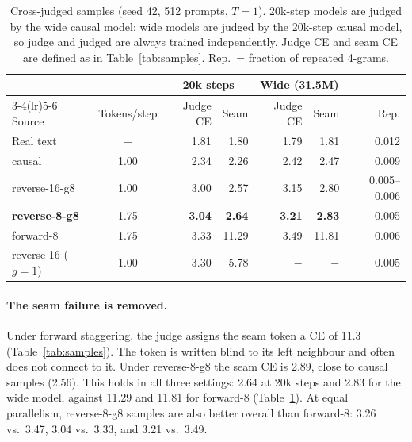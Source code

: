 \documentclass[11pt]{article}
\theoremstyle{definition}
\theoremstyle{remark}
\newcommand{\sch}[1]{\textsf{#1}}
\begin{document}
\begin{table}[t]
  \centering
  \caption{Cross-judged samples (seed 42, 512 prompts, $T=1$). 20k-step models are judged by the wide causal model; wide models are judged by the 20k-step causal model, so judge and judged are always trained independently. Judge CE and seam CE are defined as in Table~\ref{tab:samples}. Rep.\ = fraction of repeated 4-grams.}
  \label{tab:cross}
  \small
  \begin{tabular}{lcrrrrr}
    \toprule
    & & \multicolumn{2}{c}{20k steps} & \multicolumn{2}{c}{Wide (31.5M)} & \\
    \cmidrule(lr){3-4}\cmidrule(lr){5-6}
    Source & Tokens/step & Judge CE & Seam & Judge CE & Seam & Rep. \\
    \midrule
    Real text                   & $-$  & 1.81 & 1.80 & 1.79 & 1.81 & 0.012 \\
    \sch{causal}                & 1.00 & 2.34 & 2.26 & 2.42 & 2.47 & 0.009 \\
    \sch{reverse-16-g8}         & 1.00 & 3.00 & 2.57 & 3.15 & 2.80 & 0.005--0.006 \\
    \textbf{\sch{reverse-8-g8}} & 1.75 & \textbf{3.04} & \textbf{2.64} & \textbf{3.21} & \textbf{2.83} & 0.005 \\
    \sch{forward-8}             & 1.75 & 3.33 & 11.29 & 3.49 & 11.81 & 0.006 \\
    \sch{reverse-16} ($g=1$)    & 1.00 & 3.30 & 5.78 & $-$ & $-$ & 0.005 \\
    \bottomrule
  \end{tabular}
\end{table}

\paragraph{The seam failure is removed.}
Under forward staggering, the judge assigns the seam token a CE of 11.3 (Table~\ref{tab:samples}).
The token is written blind to its left neighbour and often does not connect to it.
Under \sch{reverse-8-g8} the seam CE is 2.89, close to causal samples (2.56).
This holds in all three settings: 2.64 at 20k steps and 2.83 for the wide model, against 11.29 and 11.81 for \sch{forward-8} (Table~\ref{tab:cross}).
At equal parallelism, \sch{reverse-8-g8} samples are also better overall than \sch{forward-8}: 3.26 vs.\ 3.47, 3.04 vs.\ 3.33, and 3.21 vs.\ 3.49.
\end{document}
